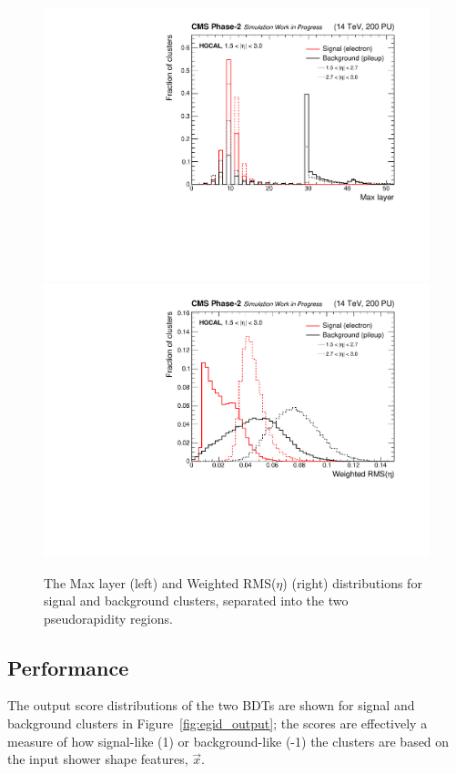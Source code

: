 \begin{figure}[htb!]
  \centering
  \includegraphics[width=.49\textwidth]{Figures/cms/egid/cl3d_maxlayer.pdf}
  \includegraphics[width=.49\textwidth]{Figures/cms/egid/cl3d_seetot.pdf}
  \caption[$e/\gamma$ identification input feature distributions]
  {
    The Max layer (left) and Weighted RMS($\eta$) (right) distributions for signal and background clusters, separated into the two pseudorapidity regions.
  }
  \label{fig:egid_features}
\end{figure}

\subsection{Performance}
The output score distributions of the two BDTs are shown for signal and background clusters in Figure~\ref{fig:egid_output}; the scores are effectively a measure of how signal-like (1) or background-like (-1) the clusters are based on the input shower shape features, $\vec{x}$. 

